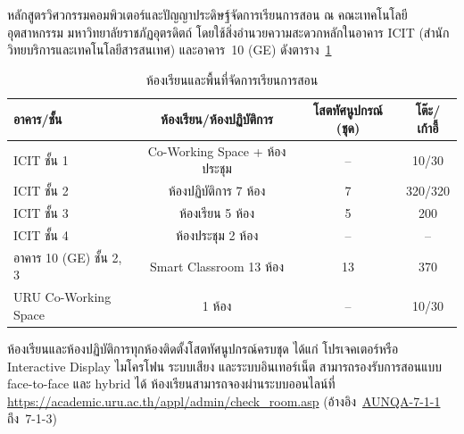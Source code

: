 


หลักสูตรวิศวกรรมคอมพิวเตอร์และปัญญาประดิษฐ์จัดการเรียนการสอน ณ คณะเทคโนโลยีอุตสาหกรรม มหาวิทยาลัยราชภัฏอุตรดิตถ์ โดยใช้สิ่งอำนวยความสะดวกหลักในอาคาร ICIT (สำนักวิทยบริการและเทคโนโลยีสารสนเทศ) และอาคาร~10 (GE) ดังตาราง~\ref{tbl:classrooms}

\begin{table}[H]
  \centering
  \caption{ห้องเรียนและพื้นที่จัดการเรียนการสอน}
  \label{tbl:classrooms}
  \begingroup
  \footnotesize
  \setlength{\tabcolsep}{3pt}
  \renewcommand{\arraystretch}{1.2}
  \begin{tabularx}{\linewidth}{|>{\raggedright\arraybackslash}X|c|c|c|}
    \hline
    \textbf{อาคาร/ชั้น} & \textbf{ห้องเรียน/ห้องปฏิบัติการ} & \textbf{โสตทัศนูปกรณ์ (ชุด)} & \textbf{โต๊ะ/เก้าอี้} \\
    \hline
    ICIT ชั้น 1 & Co-Working Space + ห้องประชุม & -- & 10/30 \\
    \hline
    ICIT ชั้น 2 & ห้องปฏิบัติการ 7 ห้อง & 7 & 320/320 \\
    \hline
    ICIT ชั้น 3 & ห้องเรียน 5 ห้อง & 5 & 200 \\
    \hline
    ICIT ชั้น 4 & ห้องประชุม 2 ห้อง & -- & -- \\
    \hline
    อาคาร 10 (GE) ชั้น 2, 3 & Smart Classroom 13 ห้อง & 13 & 370 \\
    \hline
    URU Co-Working Space & 1 ห้อง & -- & 10/30 \\
    \hline
  \end{tabularx}
  \endgroup
\end{table}

ห้องเรียนและห้องปฏิบัติการทุกห้องติดตั้งโสตทัศนูปกรณ์ครบชุด ได้แก่ โปรเจคเตอร์หรือ Interactive Display ไมโครโฟน ระบบเสียง และระบบอินเทอร์เน็ต สามารถรองรับการสอนแบบ face-to-face และ hybrid ได้ ห้องเรียนสามารถจองผ่านระบบออนไลน์ที่ \url{https://academic.uru.ac.th/appl/admin/check_room.asp} (อ้างอิง~\hyperlink{ref:AUNQA-7-1-1}{AUNQA-7-1-1} ถึง~7-1-3)

